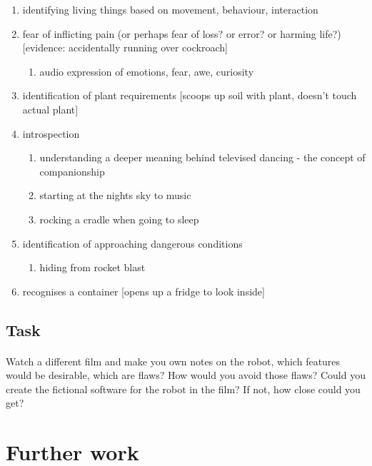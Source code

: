 \documentclass[11pt]{book}
\begin{document}
\begin{enumerate}
\item identifying living things based on movement, behaviour, interaction
\item fear of inflicting pain (or perhaps fear of loss? or error? or harming life?) [evidence: accidentally running over cockroach]
    \begin{enumerate}
    \item audio expression of emotions, fear, awe, curiosity
    \end{enumerate}
\item identification of plant requirements [scoops up soil with plant, doesn't touch actual plant]
\item introspection
  \begin{enumerate}
  \item understanding a deeper meaning behind televised dancing - the concept of companionship
  \item starting at the nights sky to music
  \item rocking a cradle when going to sleep
  \end{enumerate}
\item identification of approaching dangerous conditions
  \begin{enumerate}
  \item hiding from rocket blast
  \end{enumerate}
\item recognises a container [opens up a fridge to look inside]
\end{enumerate}

\subsection{Task}

\paragraph{} Watch a different film and make you own notes on the robot, which features would be desirable, which are flaws? How would you avoid those flaws? Could you create the fictional software for the robot in the film? If not, how close could you get?

\clearpage

\section{Further work}
\end{document}
